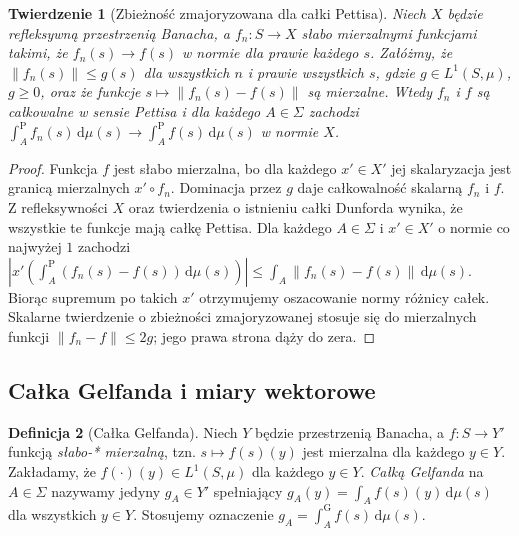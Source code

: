 \documentclass[11pt,a4paper]{article}
\numberwithin{equation}{section}
\theoremstyle{plain}
\newtheorem{twierdzenie}{Twierdzenie}[section]
\theoremstyle{definition}
\newtheorem{definicja}[twierdzenie]{Definicja}
\theoremstyle{remark}
\begin{document}
\begin{twierdzenie}[Zbieżność zmajoryzowana dla całki Pettisa]
\label{thm:pettis-convergence15b}
Niech $X$ będzie refleksywną przestrzenią Banacha, a
$f_n:S\to X$ słabo mierzalnymi funkcjami takimi, że
$f_n(s)\to f(s)$ w normie dla prawie każdego $s$.
Załóżmy, że $\|f_n(s)\|\le g(s)$ dla wszystkich $n$
i prawie wszystkich $s$, gdzie $g\in L^1(S,\mu)$,
$g\ge0$, oraz że funkcje
$s\mapsto\|f_n(s)-f(s)\|$ są mierzalne.
Wtedy $f_n$ i $f$ są całkowalne w sensie Pettisa i dla
każdego $A\in\Sigma$ zachodzi
$\int_A^{\mathrm P}f_n(s)\,\mathrm d\mu(s)
\to\int_A^{\mathrm P}f(s)\,\mathrm d\mu(s)$ w normie $X$.
\end{twierdzenie}
\begin{proof}
Funkcja $f$ jest słabo mierzalna, bo dla każdego $x'\in X'$
jej skalaryzacja jest granicą mierzalnych $x'\circ f_n$.
Dominacja przez $g$ daje całkowalność skalarną $f_n$ i $f$.
Z refleksywności $X$ oraz twierdzenia o istnieniu całki
Dunforda wynika, że wszystkie te funkcje mają całkę Pettisa.
Dla każdego $A\in\Sigma$ i $x'\in X'$ o normie co najwyżej
$1$ zachodzi
$|x'(\int_A^{\mathrm P}(f_n(s)-f(s))\,\mathrm d\mu(s))|
\le\int_A\|f_n(s)-f(s)\|\,\mathrm d\mu(s)$.
Biorąc supremum po takich $x'$ otrzymujemy oszacowanie
normy różnicy całek. Skalarne twierdzenie o zbieżności
zmajoryzowanej stosuje się do mierzalnych funkcji
$\|f_n-f\|\le2g$; jego prawa strona dąży do zera.
\end{proof}

\subsection{Całka Gelfanda i miary wektorowe}

\begin{definicja}[Całka Gelfanda]
\label{def:gelfand15b}
Niech $Y$ będzie przestrzenią Banacha, a
$f:S\to Y'$ funkcją \emph{słabo-* mierzalną}, tzn.
$s\mapsto f(s)(y)$ jest mierzalna dla każdego $y\in Y$.
Zakładamy, że $f(\cdot)(y)\in L^1(S,\mu)$ dla każdego
$y\in Y$. \emph{Całką Gelfanda} na $A\in\Sigma$ nazywamy
jedyny $g_A\in Y'$ spełniający
$g_A(y)=\int_Af(s)(y)\,\mathrm d\mu(s)$ dla wszystkich
$y\in Y$. Stosujemy oznaczenie
$g_A=\int_A^{\mathrm G}f(s)\,\mathrm d\mu(s)$.
\end{definicja}
\end{document}
